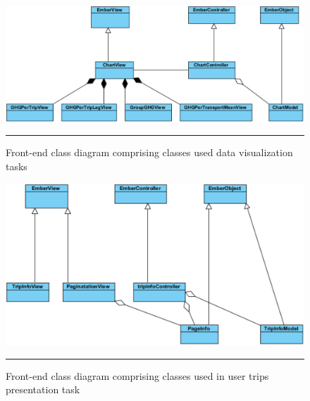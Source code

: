 \begin{figure}[htbp]
	\centering
		\includegraphics[scale=0.70]{./Figures/chapter4/figure8.pdf}
		\rule{35em}{0.5pt}
		\caption[Front-end class diagram comprising classes used in data visualization tasks]{Front-end class diagram comprising classes used data visualization tasks}
	\label{fig:frontEndClassDiagramVisualizationTasks}
\end{figure}

\begin{figure}[htbp]
	\centering
		\includegraphics[scale=0.70]{./Figures/chapter4/figure11.pdf}
		\rule{35em}{0.5pt}
		\caption[Front-end class diagram comprising classes used in user trips presentation task]{Front-end class diagram comprising classes used in user trips presentation task}
	\label{fig:frontEndClassDiagramUserTripPresentationTask}
\end{figure}

